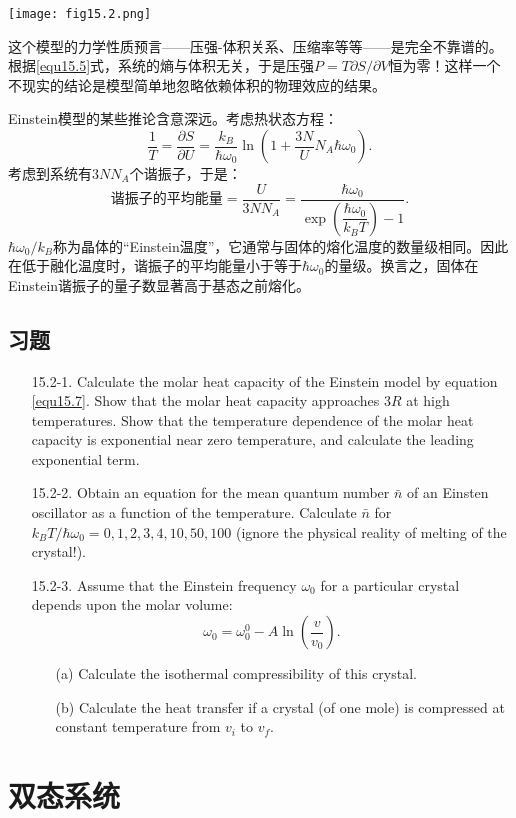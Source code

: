 {
	\centering
	\texttt{[image: fig15.2.png]}
	\label{fig15.2}
}

这个模型的力学性质预言——压强-体积关系、压缩率等等——是完全不靠谱的。根据\eqref{equ15.5}式，系统的熵与体积无关，于是压强$P = T \partial S / \partial V$恒为零！这样一个不现实的结论是模型简单地忽略依赖体积的物理效应的结果。

Einstein模型的某些推论含意深远。考虑热状态方程：
\begin{equation}
	\frac{1}{T} = \frac{\partial S}{\partial U} = \frac{k_B}{\hbar \omega_0} \ln \left(1 + \frac{3N}{U} N_A \hbar \omega_0 \right).
\label{equ15.6}
\end{equation}
考虑到系统有$3 N N_A$个谐振子，于是：
\begin{equation}
	\text{谐振子的平均能量} = \frac{U}{3N N_A} = \frac{\hbar \omega_0}{\exp \left( \dfrac{\hbar \omega_0}{k_B T} \right) - 1}.
\label{equ15.7}
\end{equation}
$\hbar \omega_0 / k_B$称为晶体的“Einstein温度”，它通常与固体的熔化温度的数量级相同。因此在低于融化温度时，谐振子的平均能量小于等于$\hbar \omega_0$的量级。换言之，固体在Einstein谐振子的量子数显著高于基态之前熔化。

\subsection*{习题}
\begin{itemize}
	\item[15.2-1.] Calculate the molar heat capacity of the Einstein model by equation \eqref{equ15.7}. Show that the molar heat capacity approaches $3R$ at high temperatures. Show that the temperature dependence of the molar heat capacity is exponential near zero temperature, and calculate the leading exponential term.
	\item[15.2-2.] Obtain an equation for the mean quantum number $\bar{n}$ of an Einsten oscillator as a function of the temperature. Calculate $\bar{n}$ for $k_B T / \hbar \omega_0 = 0, 1, 2, 3, 4, 10, 50, 100$ (ignore the physical reality of melting of the crystal!).
	\item[15.2-3.] Assume that the Einstein frequency $\omega_0$ for a particular crystal depends upon the molar volume:
	\[
		\omega_0 = \omega_0^0 - A \ln \left( \frac{v}{v_0} \right).
	\]
	\begin{itemize}
		\item[(a)] Calculate the isothermal compressibility of this crystal.
		\item[(b)] Calculate the heat transfer if a crystal (of one mole) is compressed at constant temperature from $v_i$ to $v_f$.
	\end{itemize}
\end{itemize}

\section{双态系统}
\label{sec15.3}
